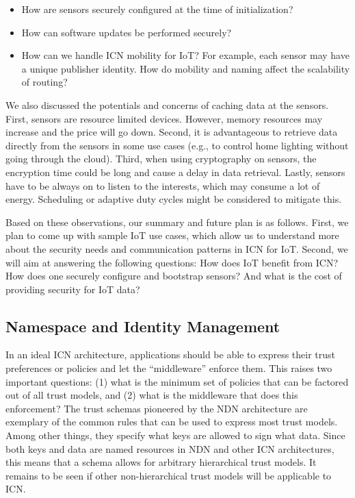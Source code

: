 \documentclass{sig-alternate-10pt}
\begin{document}
\begin{itemize}
\item How are sensors securely configured at the time of initialization?
\item How can software updates be performed securely?
\item How can we handle ICN mobility for IoT? For example, each sensor may have a unique publisher identity. How do mobility and naming affect the scalability of routing?
\end{itemize}

We also discussed the potentials and concerns of caching data at the sensors. First, sensors are resource limited devices. However, memory resources may increase and the price will go down. Second, it is advantageous to retrieve data directly from the sensors in some use cases (e.g., to control home lighting without going through the cloud). Third, when using cryptography on sensors, the encryption time could be long and cause a delay in data retrieval. Lastly, sensors have to be always on to listen to the interests, which may consume a lot of energy. Scheduling or adaptive duty cycles might be considered to mitigate this.

Based on these observations, our summary and future plan is as follows. First, we plan to come up with sample IoT use cases, which allow us to understand more about the security needs and communication patterns in ICN for IoT. Second, we will aim at answering the following questions: How does IoT benefit from ICN? How does one securely configure and bootstrap sensors? And what is the cost of providing security for IoT data?

\subsection{Namespace and Identity Management}
In an ideal ICN architecture, applications should be able to express their trust preferences or policies and let the ``middleware'' enforce them. This raises two important questions: (1) what is the minimum set of policies that can be factored out of all trust models, and (2) what is the middleware that does this enforcement? The trust schemas pioneered by the NDN architecture \cite{schemas} are exemplary of the common rules that can be used to express most trust models. Among other things, they specify what keys are allowed to sign what data. Since both keys and data are named resources in NDN and other ICN architectures, this means that a schema allows for arbitrary hierarchical trust models. It remains to be seen if other non-hierarchical trust models will be applicable to ICN.
\end{document}

